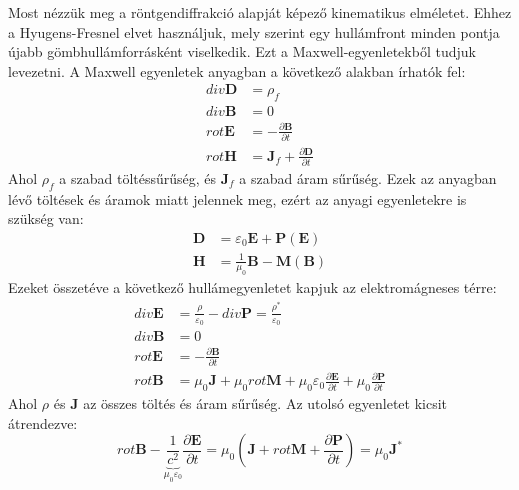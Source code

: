 \documentclass[../main.tex]{subfiles}
\begin{document}
Most nézzük meg a röntgendiffrakció alapját képező kinematikus elméletet. Ehhez a Hyugens-Fresnel elvet használjuk, mely szerint egy hullámfront minden pontja újabb gömbhullámforrásként viselkedik.
Ezt a Maxwell-egyenletekből tudjuk levezetni. A Maxwell egyenletek anyagban a következő alakban írhatók fel:
\begin{equation}
    \begin{aligned}
        div \mathbf{D} &= \rho_f \\
        div \mathbf{B} &= 0 \\
        rot \mathbf{E} &= -\frac{\partial \mathbf{B}}{\partial t} \\
        rot \mathbf{H} &= \mathbf{J}_f + \frac{\partial \mathbf{D}}{\partial t} 
    \end{aligned}
\end{equation}
Ahol $\rho_f$ a szabad töltéssűrűség, és $\mathbf{J}_f$ a szabad áram sűrűség. Ezek az anyagban lévő töltések és áramok miatt jelennek meg, ezért az anyagi egyenletekre is szükség van:
\begin{equation}
    \begin{aligned}
        \mathbf{D} &= \varepsilon_0 \mathbf{E} + \mathbf{P}(\mathbf{E}) \\
        \mathbf{H} &= \frac{1}{\mu_0} \mathbf{B} - \mathbf{M}(\mathbf{B})
    \end{aligned}
\end{equation}
Ezeket összetéve a következő hullámegyenletet kapjuk az elektromágneses térre:
\begin{equation}
    \begin{aligned}
        div \mathbf{E} &= \frac{\rho}{\varepsilon_0} - div \mathbf{P} = \frac{\rho^*}{\varepsilon_0}\\
        div \mathbf{B} &= 0 \\
        rot \mathbf{E} &= -\frac{\partial \mathbf{B}}{\partial t} \\
        rot \mathbf{B} &= \mu_0 \mathbf{J} + \mu_0 rot \mathbf{M} + \mu_0 \varepsilon_0 \frac{\partial \mathbf{E}}{\partial t} + \mu_0 \frac{\partial \mathbf{P}}{\partial t}
    \end{aligned}
\end{equation}
Ahol $\rho$ és $\mathbf{J}$ az összes töltés és áram sűrűség. Az utolsó egyenletet kicsit átrendezve:
\begin{equation}
    rot \mathbf{B} - \underbrace{\frac{1}{c^2}}_{\mu_0 \varepsilon_0} \frac{\partial \mathbf{E}}{\partial t} = \mu_0 \left(\mathbf{J} + rot \mathbf{M} + \frac{\partial \mathbf{P}}{\partial t}\right) = \mu_0 \mathbf{J}^*
\end{equation}
\end{document}
